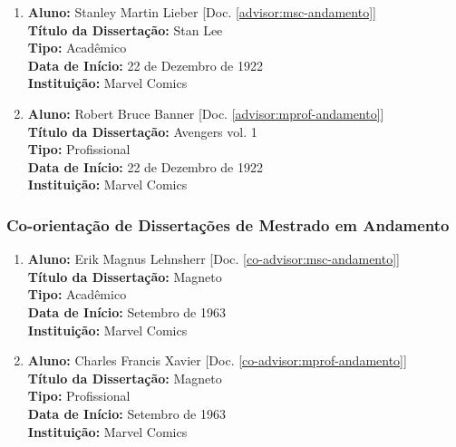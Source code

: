 \documentclass[a4paper,oneside,12pt]{article}
\begin{document}
\begin{enumerate}
\renewcommand{\labelenumi}{{\large\bfseries\arabic{enumi}.}}

\item       \textbf{Aluno:} Stanley Martin Lieber [Doc. \ref{advisor:msc-andamento}]\\
            \textbf{Título da Dissertação:} Stan Lee\\
            \textbf{Tipo:} Acadêmico \\%
            \textbf{Data de Início:} 22 de Dezembro de 1922\\
            \textbf{Instituição:} Marvel Comics

\item       \textbf{Aluno:} Robert Bruce Banner [Doc. \ref{advisor:mprof-andamento}]\\
            \textbf{Título da Dissertação:} Avengers vol. 1\\
            \textbf{Tipo:} Profissional\\
            \textbf{Data de Início:} 22 de Dezembro de 1922\\
            \textbf{Instituição:} Marvel Comics
\end{enumerate}

\subsubsection{Co-orientação de Dissertações de Mestrado em Andamento}
\vspace{0.3cm}

\begin{enumerate}
\renewcommand{\labelenumi}{{\large\bfseries\arabic{enumi}.}}

\item       \textbf{Aluno:} Erik Magnus Lehnsherr [Doc. \ref{co-advisor:msc-andamento}]\\
            \textbf{Título da Dissertação:} Magneto\\
            \textbf{Tipo:} Acadêmico \\%
            \textbf{Data de Início:} Setembro de 1963\\
            \textbf{Instituição:} Marvel Comics

\item       \textbf{Aluno:} Charles Francis Xavier [Doc. \ref{co-advisor:mprof-andamento}]\\
            \textbf{Título da Dissertação:} Magneto\\
            \textbf{Tipo:} Profissional\\
            \textbf{Data de Início:} Setembro de 1963\\
            \textbf{Instituição:} Marvel Comics
\end{enumerate}
\end{document}
